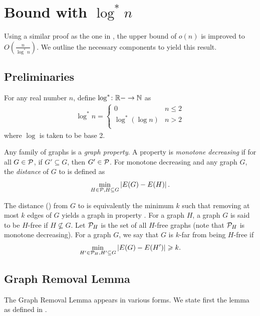 \section{Bound with $\log^* n$}

Using a similar proof as the one in , the upper bound of $o(n)$ is improved to $O\left(\frac{n}{\log^* n}\right)$. We outline the necessary components to yield this result.

\subsection{Preliminaries}

\begin{definition}[$\log^* n$]
	For any real number $n$, define $\log^*\colon {\mathbb R} -\rightarrow {\mathbb N}$ as
	\begin{align*}
		\log^*n = \begin{cases}
			0 & n \leq 2\\
			\log^* (\log n) & n > 2\\
		\end{cases}
	\end{align*}
	where $\log$ is taken to be base 2.
\end{definition}

\begin{definition}
	Any family of graphs \cP is a {\em graph property}.
	A property \cP is {\em monotone decreasing} if for all $G \in {\mathcal P}$, if $G' \subseteq G$, then $G' \in {\mathcal P}$. For monotone decreasing \cP and any graph $G$, the {\em distance} of $G$ to \cP is defined as
	\begin{align*}
		\underset{H\in {\mathcal P}, H\subseteq G}{\min}\left\vert{E(G)-E(H)}\right\vert.
	\end{align*}
\end{definition}
The distance (\cite{Lee15}) from $G$ to \cP is equivalently the minimum $k$ such that removing at most $k$ edges of $G$ yields a graph in property \cP. For a graph $H$, a graph $G$ is said to be $H$-free if $H \not\subseteq G$. Let ${\mathcal P}_H$ is the set of all $H$-free graphs (note that ${\mathcal P}_H$ is monotone decreasing). For a graph $G$, we say that $G$ is $k$-far from being $H$-free if
\begin{align*}
	\underset{H'\in {\mathcal P}_H, H'\subseteq G}{\min}\left\vert{E(G)-E(H')}\right\vert \geqslant k.
\end{align*}

\subsection{Graph Removal Lemma~\cite{Lee15}}
The Graph Removal Lemma appears in various forms. We state first the lemma as defined in \cite{Lee15}.

